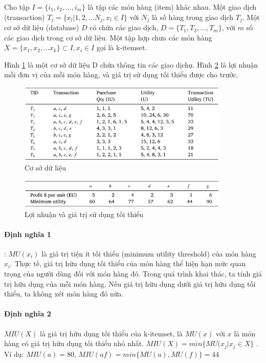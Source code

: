 
Cho tập $ I = \{i_1, i_2, ..., i_m\}$ là tập các món hàng (item) khác nhau. Một giao dịch (transaction) $T_j = \{x_l | 1, 2, ...N_j, x_l \in I \} $ với $N_j$ là số hàng trong giao dịch  $T_j$. Một cơ sở dữ liệu (database) $D$ có chứa các giao dịch, $D = \{T_1, T_2, ..., T_m\}$, với $m$ số các giao dịch trong cơ sở dữ liệu. Một tập hợp chưa các món hàng $X =\{ x_1, x_2, ... x_k \} \subset I, x_i \in I $ gọi là k-itemset. 

Hình \ref{fig:table2} là một cơ sở dữ liệu D chứa thông tin các giao dịchụ. Hình \ref{fig:table3} là lợi nhuận mỗi đơn vị của mỗi món hàng, và giá trị sử dụng tối thiểu được cho trước.



\begin{figure}[h]
\centering
\includegraphics[width=0.9\textwidth]{image/table/table2.PNG}
\caption{\label{fig:table2} Cơ sở dữ liệu}
\end{figure}

\begin{figure}[h]
\centering
\includegraphics[width=0.9\textwidth]{image/table/table3.PNG}
\caption{\label{fig:table3} Lợi nhuận và giá trị sử dụng tối thiểu}
\end{figure}

\paragraph{Định nghĩa 1}: $ MU(x_i) $ là giá trị tiện ít tối thiểu (minimum utility threshold) của món hàng $x_i$. Thực tế, giá trị hữu dụng tối thiểu của món hàng thể hiện hạn mức quan trọng của người dùng đối với món hàng đó. Trong quá trình khai thác, ta tính giá trị hữu dụng của mỗi món hàng. Nếu giá trị hữu dụng dưới giá trị hữu dụng tối thiểu, ta không xét món hàng đó nữa. 

\paragraph{Định nghĩa 2} $MIU(X)$ là giá trị hữu dụng tối thiểu của k-itemset, là $MU(x)$ với $x$ là món hàng có giá trị hữu dụng tối thiểu nhỏ nhất. $MIU(X) = min \{MU(x_j|x_j \in X\}$ . Ví dụ: $MIU(a) = 80$, $MIU(af) = min\{MU(a), MU(f)\} = 44$


